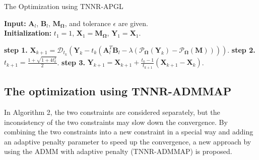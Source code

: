 \documentclass{article}
\begin{document}
{\begin{algorithm}[t]
    \caption{The Optimization using TNNR-APGL}
    \label{algo3}
    \textbf{Input:} $\mathbf A_l$, $\mathbf B_l$, $\mathbf M_{\mathbf\Omega}$, and tolerance $\epsilon$ are given.\\
    \textbf{Initialization:} $t_1 = 1$, $\mathbf X_1 = \mathbf M_{\mathbf\Omega}$, $\mathbf Y_1=\mathbf X_1$.
    \begin{algorithmic}
        \Repeat 
        \State \textbf{step 1.} $\mathbf X_{k+1} = \mathcal{D}_{t_k}(\mathbf Y_k - t_k(\mathbf A_l^T\mathbf B_l - \lambda(\mathcal{P}_{\mathbf\Omega}(\mathbf Y_k)- \mathcal{P}_{\mathbf\Omega}(\mathbf M))))$.
        \State \textbf{step 2.} $t_{k+1} = \frac{1+\sqrt{1+4t^2_k}}{2}$.
        \State \textbf{step 3.} $\mathbf Y_{k+1} = \mathbf X_{k+1} +\frac{t_{k}-1}{t_{k+1}}(\mathbf X_{k+1}-\mathbf X_{k})$.
    \end{algorithmic}
\end{algorithm}


\subsection{The optimization using TNNR-ADMMAP}
In Algorithm 2, the two constraints are considered separately, but the inconsistency of the two constraints may slow down the convergence.
By combining the two constraints into a new constraint in a special way and adding an adaptive penalty parameter to speed up the convergence,  a new approach by using the ADMM with adaptive penalty (TNNR-ADMMAP) is proposed.
}
\end{document}
